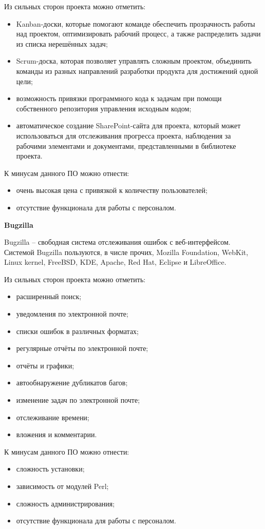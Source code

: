 Из сильных сторон проекта можно отметить:
\begin{itemize}
    \item Kanban-доски, которые помогают команде обеспечить прозрачность работы над проектом, оптимизировать рабочий процесс, а также распределить задачи из списка нерешённых задач;
    \item Scrum-доска, которая позволяет управлять сложным проектом, объединить команды из разных направлений разработки продукта для достижений одной цели;
    \item возможность привязки программного кода к задачам при помощи собственного репозитория управления исходным кодом;
    \item автоматическое создание SharePoint-сайта для проекта, который может использоваться для отслеживания прогресса проекта, наблюдения за рабочими элементами и документами, представленными в библиотеке проекта.
\end{itemize}

К минусам данного ПО можно отнести:
\begin{itemize}
    \item очень высокая цена с привязкой к количеству пользователей;
    \item отсутствие функционала для работы с персоналом.
\end{itemize}

\bigskip
\textbf{Bugzilla}

Bugzilla – свободная система отслеживания ошибок с веб-интерфейсом. Системой Bugzilla пользуются, в числе прочих, Mozilla Foundation, WebKit, Linux kernel, FreeBSD, KDE, Apache, Red Hat, Eclipse и LibreOffice.

Из сильных сторон проекта можно отметить:
\begin{itemize}
    \item расширенный поиск;
    \item уведомления по электронной почте;
    \item списки ошибок в различных форматах;
    \item регулярные отчёты по электронной почте;
    \item отчёты и графики;
    \item автообнаружение дубликатов багов;
    \item изменение задач по электронной почте;
    \item отслеживание времени;
    \item вложения и комментарии.
\end{itemize}

К минусам данного ПО можно отнести:
\begin{itemize}
    \item сложность установки;
    \item зависимость от модулей Perl;
    \item сложность администрирования;
    \item отсутствие функционала для работы с персоналом.
\end{itemize}
